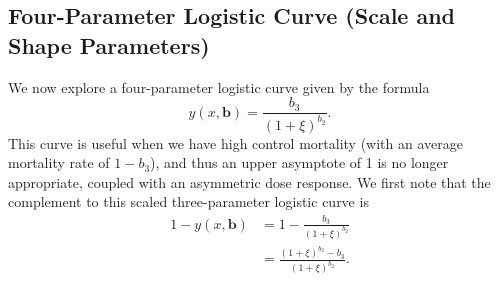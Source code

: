 \documentclass[11pt, letterpaper]{article}
\begin{document}
\subsection{Four-Parameter Logistic Curve (Scale and Shape Parameters)}
We now explore a four-parameter logistic curve given by the formula
$$ y(x, \bm b) = \frac{b_3}{(1+\xi)^{b_2}} .$$ 
This curve is useful when we have high control mortality (with an average mortality rate of $1-b_3$), and thus an upper asymptote of 1 is no longer appropriate, coupled with an asymmetric dose response. We first note that the complement to this scaled three-parameter logistic curve is 
\begin{align*}
1 - y(x, \bm b) & = 1- \frac{b_3}{(1+\xi)^{b_2}} \\
& = \frac{(1+\xi)^{b_2} - b_3}{(1+\xi)^{b_2}}.
\end{align*}
\end{document}
